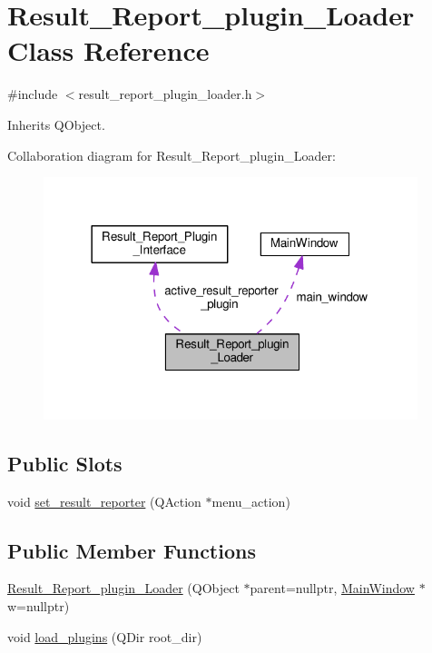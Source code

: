 \hypertarget{classResult__Report__plugin__Loader}{}\section{Result\+\_\+\+Report\+\_\+plugin\+\_\+\+Loader Class Reference}
\label{classResult__Report__plugin__Loader}


{\ttfamily \#include $<$result\+\_\+report\+\_\+plugin\+\_\+loader.\+h$>$}



Inherits Q\+Object.



Collaboration diagram for Result\+\_\+\+Report\+\_\+plugin\+\_\+\+Loader\+:\nopagebreak
\begin{figure}[H]
\begin{center}
\leavevmode
\includegraphics[width=309pt]{classResult__Report__plugin__Loader__coll__graph}
\end{center}
\end{figure}
\subsection*{Public Slots}
\begin{DoxyCompactItemize}
\item 
void \hyperlink{classResult__Report__plugin__Loader_a01bc8e810f4118732a39d4586730496c}{set\+\_\+result\+\_\+reporter} (Q\+Action $\ast$menu\+\_\+action)
\end{DoxyCompactItemize}
\subsection*{Public Member Functions}
\begin{DoxyCompactItemize}
\item 
\hyperlink{classResult__Report__plugin__Loader_a6276745d1351cafa6ba2a08e1909240c}{Result\+\_\+\+Report\+\_\+plugin\+\_\+\+Loader} (Q\+Object $\ast$parent=nullptr, \hyperlink{classMainWindow}{Main\+Window} $\ast$w=nullptr)
\item 
void \hyperlink{classResult__Report__plugin__Loader_a15c218e7f32052f74d70fed200922fce}{load\+\_\+plugins} (Q\+Dir root\+\_\+dir)
\end{DoxyCompactItemize}
